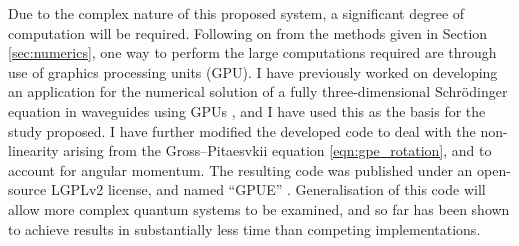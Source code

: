
Due to the complex nature of this proposed system, a significant degree of computation will be required. Following on from the methods given in Section \ref{sec:numerics}, one way to perform the large computations required are through use of graphics processing units (GPU). I have previously worked on developing an application for the numerical solution of a fully three-dimensional Schr\"{o}dinger equation in waveguides using GPUs \cite{AO:Morgan_ORiordan_pra_2013}, and I have used this as the basis for the study proposed. I have further modified the developed code to deal with the non-linearity arising from the Gross--Pitaesvkii equation \eqref{eqn:gpe_rotation}, and to account for angular momentum. The resulting code was published under an open-source LGPLv2 license, and named ``GPUE'' \cite{NUM:gpue}. Generalisation of this code will allow more complex quantum systems to be examined, and so far has been shown to achieve results in substantially less time than competing implementations.


